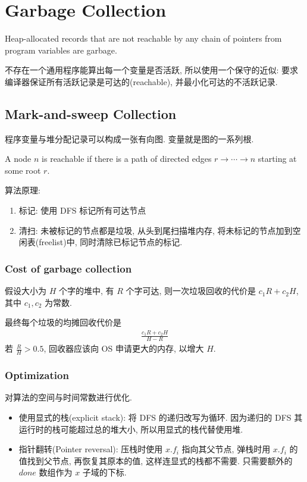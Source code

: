 \section{Garbage Collection}
\begin{definition}[Garbage]
    Heap-allocated records that are not reachable by any chain of pointers from program variables are garbage.
\end{definition}

不存在一个通用程序能算出每一个变量是否活跃, 所以使用一个保守的近似: 要求编译器保证所有活跃记录是可达的(reachable), 并最小化可达的不活跃记录. 

\subsection{Mark-and-sweep Collection}
程序变量与堆分配记录可以构成一张有向图. 变量就是图的一系列根.

\begin{definition}[reachable]
    A node $n$ is reachable if there is a path of directed edges $r \to\cdots \to  n$ starting at some root $r$.
\end{definition}

算法原理:
\begin{enumerate}
    \item 标记: 使用 DFS 标记所有可达节点
    \item 清扫: 未被标记的节点都是垃圾, 从头到尾扫描堆内存, 将未标记的节点加到空闲表(freelist)中, 同时清除已标记节点的标记. 
\end{enumerate}

\subsubsection{Cost of garbage collection}
假设大小为 $H$ 个字的堆中, 有 $R$ 个字可达, 则一次垃圾回收的代价是 $c_1R+c_2H$, 其中 $c_1, c_2$ 为常数. 

最终每个垃圾的均摊回收代价是 
\begin{align*}
    \frac{c_1R+c_2H}{H-R}
\end{align*}
若 $\frac{R}{H}>0.5$, 回收器应该向 OS 申请更大的内存, 以增大 $H$.

\subsubsection{Optimization}
对算法的空间与时间常数进行优化. 

\begin{itemize}
    \item 使用显式的栈(explicit stack): 将 DFS 的递归改写为循环. 因为递归的 DFS 其运行时的栈可能超过总的堆大小, 所以用显式的栈代替使用堆.
    \item 指针翻转(Pointer reversal): 压栈时使用 $x.f_i$ 指向其父节点, 弹栈时用  $x.f_i$ 的值找到父节点, 再恢复其原本的值, 这样连显式的栈都不需要. 只需要额外的 $done$ 数组作为 $x$ 子域的下标.
\end{itemize}

